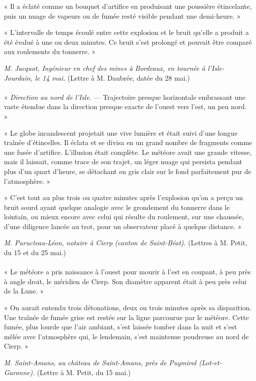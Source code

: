 \documentclass[a4paper, 11pt, oneside, polutonikogreek, french]{article}
\begin{document}
« Il a éclaté comme un bouquet d'artifice en produisant une poussière étincelante, puis un nuage de vapeurs ou de fumée resté visible pendant une demi-heure. »

« L'intervalle de temps écoulé entre cette explosion et le bruit qu'elle a produit a été évalué à une ou deux minutes. Ce bruit s'est prolongé et pouvait être comparé aux roulements du tonnerre. »
\begin{center}
\emph{M. Jacquot, Ingénieur en chef des mines à Bordeaux, en tournée à l'Isle-Jourdain, le 14 mai.} (Lettre à M. Daubrée, datée du 28 mai.)
\end{center}
\paragraph{}
« \emph{Direction au nord de l'Isle.} --- Trajectoire presque horizontale embrassant une vaste étendue dans la direction presque exacte de l'ouest vers l'est, un peu nord. »

« Le globe incandescent projetait une vive lumière et était suivi d'une longue traînée d'étincelles. Il éclata et se divisa en un grand nombre de fragments comme une fusée d'artifice. L'illusion était complète. Le météore avait une grande vitesse, mais il laissait, comme trace de son trajet, un léger nuage qui persista pendant plus d'un quart d'heure, se détachant en gris clair sur le fond parfaitement pur de l'atmosphère. »

« C'est tout au plus trois ou quatre minutes après l'explosion qu'on a perçu un bruit sourd ayant quelque analogie avec le grondement du tonnerre dans le lointain, ou mieux encore avec celui qui résulte du roulement, sur une chaussée, d'une diligence lancée au trot, pour un observateur placé à quelque distance. »
\begin{center}
\emph{M. Paructeau-Léon, notaire à Cierp (canton de Saint-Béat).} (Lettres à M. Petit, du 15 et du 25 mai.)
\end{center}
\paragraph{}
« Le météore a pris naissance à l'ouest pour mourir à l'est en coupant, à peu près à angle droit, le méridien de Cierp. Son diamètre apparent était à peu près celui de la Lune. »

« On aurait entendu trois détonations, deux ou trois minutes après sa disparition. Une traînée de fumée grise est restée sur la ligne parcourue par le météore. Cette fumée, plus lourde que l'air ambiant, s'est laissée tomber dans la nuit et s'est mêlée avec l'atmosphère qui, le lendemain, s'est maintenue poudreuse au nord de Cierp. »
\begin{center}
\emph{M. Saint-Amans, au château de Saint-Amans, près de Puymirol (Lot-et-Garonne).} (Lettre à M. Petit, du 15 mai.)
\end{center}
\end{document}
